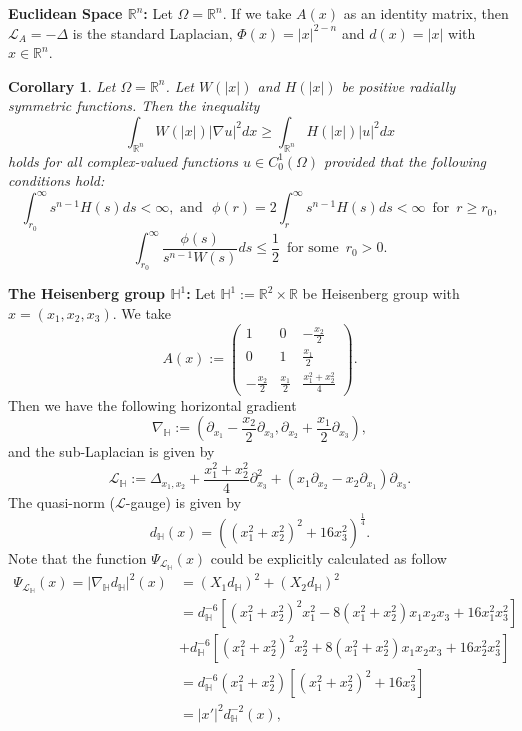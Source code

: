 \documentclass[a4paper,12pt,reqno]{amsart}
\theoremstyle{theorem}
\numberwithin{equation}{section}
\theoremstyle{plain}
\newtheorem{cor}[thm]{Corollary}
\theoremstyle{definition}
\theoremstyle{defi}
\begin{document}
{\bf Euclidean Space $\mathbb{R}^n$:} Let $\Omega  = \mathbb{R}^n$. If we take $A(x)$ as an identity matrix, then $\mathcal{L}_A = - \Delta$ is the standard Laplacian, $\Phi(x)= |x|^{2-n}$ and $d(x) = |x|$ with $x \in \mathbb{R}^n$.
\begin{cor}
	Let $\Omega = \mathbb{R}^n$. Let $W(|x|)$ and $H(|x|)$ be positive  radially symmetric functions. Then the inequality 
	\begin{equation}
	\int_{\mathbb{R}^n} W(|x|) |\nabla u|^2 dx \geq \int_{\mathbb{R}^n} H(|x|) |u|^2 dx
	\end{equation}
	holds for all complex-valued functions $u \in C^1_0(\Omega)$ provided that the following conditions hold: 
	\begin{equation}
	\int_{r_0}^{\infty} s^{n-1}H(s) ds< \infty, \,\, \text{and} \,\, \,\,	\phi(r) = 2 \int_{r}^{\infty} s^{n-1}H(s) ds < \infty \,\,\, \text{for} \,\,\, r\geq r_0,
	\end{equation}
	\begin{equation}
	\int_{r_0}^{\infty}  \frac{\phi(s)}{s^{n-1}W(s)} ds  \leq \frac{1}{2} \,\,\, \text{for some} \,\,\, r_0>0.
	\end{equation}
\end{cor}
\medskip
{\bf The Heisenberg group $\mathbb{H}^1$:}  Let $\mathbb{H}^1:= \mathbb{R}^2 \times \mathbb{R}$ be Heisenberg group with $x = (x_1,x_2,x_3)$. We take  
$$A(x):=\begin{pmatrix}
1 & 0 & -\frac{x_2}{2}\\ 0 & 1 & \frac{x_1}{2}\\
-\frac{x_2}{2} & \frac{x_1}{2} & \frac{x_1^2 + x_2^2}{4}
\end{pmatrix}.$$
Then we have the following horizontal gradient 
$$\nabla_{\mathbb{H}}:= (\partial_{x_1} - \frac{x_2}{2} \partial_{x_3}, \partial_{x_2} + \frac{x_1}{2} \partial_{x_3}),$$ and the sub-Laplacian is given by
\begin{equation*}
\mathcal{L}_{\mathbb{H}} := \Delta_{x_1,x_2} + \frac{x_1^2 + x_2^2}{4} \partial_{x_3}^2 + (x_1\partial_{x_2} - x_2 \partial_{x_1})\partial_{x_3}.
\end{equation*}
The quasi-norm ($\mathcal{L}$-gauge) is given by 
\begin{equation*}
d_{\mathbb{H}}(x) = ( (x_1^2+x_2^2)^2 + 16 x_3^2 )^{\frac{1}{4}}. 
\end{equation*}
Note that the function $\Psi_{\mathcal{L}_{\mathbb{H}}}(x)$ could be explicitly calculated as follow
\begin{align*}
\Psi_{\mathcal{L}_{\mathbb{H}}}(x) = |\nabla_{\mathbb{H}} d_{\mathbb{H}}|^2(x) &= (X_1d_{\mathbb{H}})^2+ (X_2d_{\mathbb{H}})^2 \\
& =   d_{\mathbb{H}}^{-6} [(x_1^2+x_2^2)^2 x_1^2 - 8 (x_1^2+x_2^2)x_1x_2x_3 + 16x_1^2x_3^2] \\
& + d_{\mathbb{H}}^{-6} [(x_1^2+x_2^2)^2 x_2^2 + 8 (x_1^2+x_2^2)x_1x_2x_3 + 16x_2^2x_3^2] \\
& = d_{\mathbb{H}}^{-6}(x_1^2+x_2^2)[(x_1^2+x_2^2)^2 + 16x_3^2]\\
& = |x'|^2 d_{\mathbb{H}}^{-2}(x),
\end{align*}
\end{document}
